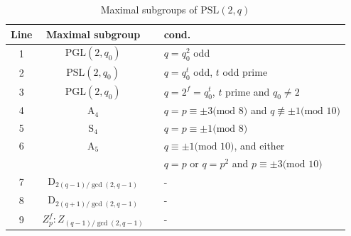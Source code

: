 \documentclass[a4paper,twopage,reqno,12pt]{amsart}
\theoremstyle{definition}
\numberwithin{equation}{section}
\newcommand{\PSL}{\mathrm{PSL}}
\begin{document}

\begin{table}[H]
\tiny
    \centering
    \caption{Maximal subgroups of $\PSL(2,q)$}\label{MaxDickson}
    \begin{tabular}{cccl}
        \toprule
        Line & Maximal subgroup & & cond. \\
        \midrule
        1 & $\mathrm{PGL}(2,q_0)$ & &$q=q_0^2$ odd \\
        2 & $\mathrm{PSL}(2,q_0)$ & &$q=q_0^t$ odd, $t$ odd prime \\
        3 & $\mathrm{PGL}(2,q_0)$ & &$q=2^f=q_0^t$, $t$ prime and $q_0\neq 2$ \\
        4 & $\mathrm{A_4}$ & &$q=p\equiv \pm 3 \text{(mod 8)}$ and $q\not\equiv \pm 1\text{(mod 10)}$ \\
        5 & $\mathrm{S_4}$ & &$q=p\equiv \pm 1\text{(mod 8)}$ \\
        6 & $\mathrm{A_5}$ & &$q\equiv \pm 1\text{(mod 10)}$, and either \\
        & & &$q=p$ or $q=p^2$ and $p\equiv \pm 3\text{(mod 10)}$ \\
        7 & $\mathrm{D}_{2(q-1)/\gcd(2,q-1)}$ & & - \\
        8 & $\mathrm{D}_{2(q+1)/\gcd(2,q-1)}$ & &- \\
        9 & $Z_p^f:Z_{(q-1)/\gcd(2,q-1)}$ & & -\\ 
        \bottomrule
    \end{tabular}
\end{table}
\end{document}
